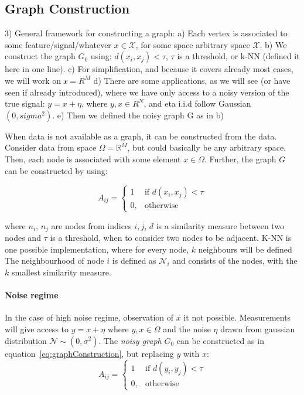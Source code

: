 \subsection{Graph Construction}
3) General framework for constructing a graph:
a) Each vertex is associated to some feature/signal/whatever $x\in \mathcal{X}$, for some space arbitrary space $\mathcal{X}$.
b) We construct the graph $G_0$ using: $d(x_i,x_j) < \tau$, $\tau$ is a threshold, or k-NN (defined it here in one line).
c) For simplification, and because it covers already most cases, we will work on $\mathcal{x}= R^M$
d) There are some applications, as we will see (or have seen if already introduced), where we have only access to a noisy version of the true signal:
 $y = x + \eta$, where $y,x \in R^N$, and eta i.i.d follow Gaussian $(0,sigma^2)$.
e) Then we defined the noisy graph G as in b)

\label{sec:graphConstruction}
When data is not available as a graph, it can be constructed from the data.
Consider data from space $\Omega = \mathbb{R}^M $, but could basically be any arbitrary space.
Then, each node is associated with some element $x \in \mathcal{\Omega}$.
Further, the graph $G$ can be constructed by using:

\begin{equation}
    \label{eq:graphConstruction}
    A_{ij} =    
    \begin{cases}
        1  & \text{if } d(x_i, x_j) < \tau\\
        0, & \text{otherwise}
    \end{cases}
\end{equation}

where $n_i$, $n_j$ are nodes from indices $i,j$, $d$ is a similarity measure between two nodes and $\tau$ is a threshold, 
when to consider two nodes to be adjacent. K-NN is one possible implementation, where for every node, $k$ neighbours will be defined
The neighbourhood of node $i$ is defined as $\mathcal{N}_i$ and consists of the nodes, with the $k$ smallest similarity measure.

\paragraph{Noise regime}
In the case of high noise regime, observation of $x$ it not possible.
Measurements will give access to  $y = x + \eta$ where $y,x \in \Omega$ and the noise $\eta$ drawn from gaussian distribution $\mathcal{N} \sim (0,\sigma^2)$.
The \textit{noisy graph} $G_0$ can be constructed as in equation~\ref{eq:graphConstruction}, but replacing $y$ with $x$:
\begin{equation}
    \label{eq:graphConstructionNoise}
    A_{ij} =    
    \begin{cases}
        1  & \text{if } d(y_i, y_j) < \tau\\
        0, & \text{otherwise}
    \end{cases}
\end{equation}


